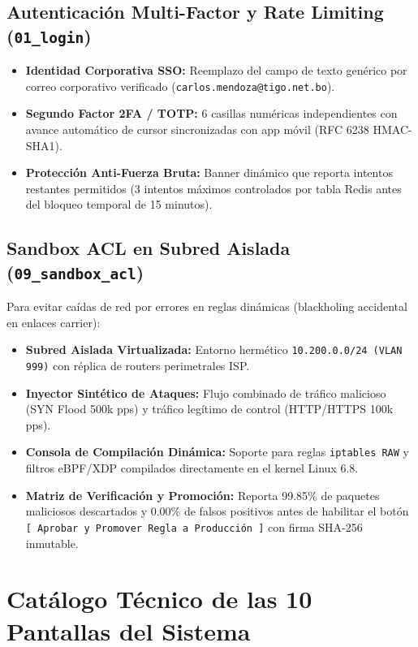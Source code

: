 \documentclass[11pt,a4paper]{article}
\begin{document}
\subsection{Autenticación Multi-Factor y Rate Limiting (\texttt{01\_login})}
\begin{itemize}[itemsep=2bp]
    \item \textbf{Identidad Corporativa SSO:} Reemplazo del campo de texto genérico por correo corporativo verificado (\texttt{carlos.mendoza@tigo.net.bo}).
    \item \textbf{Segundo Factor 2FA / TOTP:} 6 casillas numéricas independientes con avance automático de cursor sincronizadas con app móvil (RFC 6238 HMAC-SHA1).
    \item \textbf{Protección Anti-Fuerza Bruta:} Banner dinámico que reporta intentos restantes permitidos (3 intentos máximos controlados por tabla Redis antes del bloqueo temporal de 15 minutos).
\end{itemize}

\subsection{Sandbox ACL en Subred Aislada (\texttt{09\_sandbox\_acl})}
Para evitar caídas de red por errores en reglas dinámicas (blackholing accidental en enlaces carrier):
\begin{itemize}[itemsep=2bp]
    \item \textbf{Subred Aislada Virtualizada:} Entorno hermético \texttt{10.200.0.0/24 (VLAN 999)} con réplica de routers perimetrales ISP.
    \item \textbf{Inyector Sintético de Ataques:} Flujo combinado de tráfico malicioso (SYN Flood 500k pps) y tráfico legítimo de control (HTTP/HTTPS 100k pps).
    \item \textbf{Consola de Compilación Dinámica:} Soporte para reglas \texttt{iptables RAW} y filtros eBPF/XDP compilados directamente en el kernel Linux 6.8.
    \item \textbf{Matriz de Verificación y Promoción:} Reporta 99.85\% de paquetes maliciosos descartados y 0.00\% de falsos positivos antes de habilitar el botón \texttt{[ Aprobar y Promover Regla a Producción ]} con firma SHA-256 inmutable.
\end{itemize}

\newpage

\section{Catálogo Técnico de las 10 Pantallas del Sistema}
\end{document}

